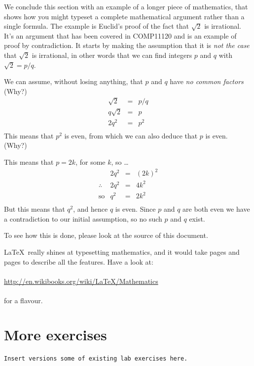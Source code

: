   We conclude this section with an example of a longer piece of mathematics, that shows how you might typeset a complete mathematical argument rather than a single formula. The example is Euclid's proof of the fact that $\sqrt{2}$ is irrational. It's an argument that has been covered in COMP11120 and is an example of proof by contradiction. It starts by making the assumption that it is \emph{not the case} that $\sqrt{2}$ is irrational, in other words that we can find integers $p$ and $q$ with $\sqrt{2} = p/q$.

  We can assume, without losing anything, that $p$ and $q$ have \emph{no common factors} (Why?)
  \[
  \begin{array}{lcl}
     \sqrt{2} & = & p/q \\ 
      q\sqrt{2} & = & p\\ 
      2q^2 & = & p^2\\ 
  \end{array}
  \]
  This means that $p^2$ is even, from which we can also deduce that $p$ is even. (Why?)

  This means that $p = 2k$, for some $k$, so \ldots
  \[
  \begin{array}{llcl}
      & 2q^2 & = & (2k)^2\\ 
      \therefore & 2q^2 & = & 4k^2\\ 
      \text{so} & q^2 & = & 2k^2\\
   \end{array}
  \]
  But this means that $q^2$, and hence $q$ is  even. Since $p$ and $q$ are both even we have a contradiction to our initial assumption, so no such $p$ and $q$ exist.

  To see how this is done, please look at the source of this document.

  \LaTeX\ really shines at typesetting mathematics, and it would take pages and pages to describe all the features. Have a look at:
\\
\\
\href{http://en.wikibooks.org/wiki/LaTeX/Mathematics}{http://en.wikibooks.org/wiki/LaTeX/Mathematics}
\\
\\
for a flavour. 
 
\section{More exercises}
\begin{verbatim}
Insert versions some of existing lab exercises here.
\end{verbatim}
